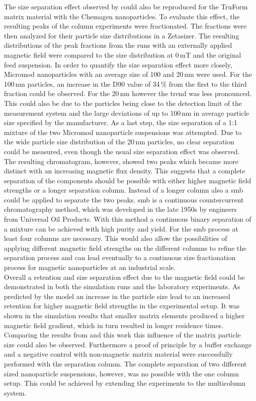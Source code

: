 The size separation effect observed by \cite{AndreMaster} could also be reproduced for the TruForm matrix material with the Chemagen nanoparticles. To evaluate this effect, the resulting peaks of the column experiments were fractionated. The fractions were then analyzed for their particle size distributions in a Zetasizer. The resulting distributions of the peak fractions from the runs with an externally applied magnetic field were compared to the size distribution at 0\,mT and the original feed suspension. In order to quantify the size separation effect more closely, Micromod nanoparticles with an average size of 100 and 20\,nm were used. For the 100\,nm particles, an increase in the D90 value of 34\,\% from the first to the third fraction could be observed. For the 20\,nm however the trend was less pronounced. This could also be due to the particles being close to the detection limit of the measurement system and the large deviations of up to 100\,nm in average particle size specified by the manufacturer. As a last step, the size separation of a 1:1 mixture of the two Micromod nanoparticle suspensions was attempted. Due to the wide particle size distribution of the 20\,nm particles, no clear separation could be measured, even though the usual size separation effect was observed. The resulting chromatogram, however, showed two peaks which became more distinct with an increasing magnetic flux density. This suggests that a complete separation of the components should be possible with either higher magnetic field strengths or a longer separation column. Instead of a longer column also a \gls{smb} could be applied to separate the two peaks. \Gls{smb} is a continuous countercurrent chromatography method, which was developed in the late 1950s by engineers from Universal Oil Products\cite{broughton1961continuous,carson1962rotary}. With this method a continuous binary separation of a mixture can be achieved with high purity and yield. For the \gls{smb} process at least four columns are necessary. This would also allow the possibilities of applying different magnetic field strengths on the different columns to refine the separation process and can lead eventually to a continuous size fractionation process for magnetic nanoparticles at an industrial scale.\\

Overall a retention and size separation effect due to the magnetic field could be demonstrated in both the simulation runs and the laboratory experiments. As predicted by the model an increase in the particle size lead to an increased retention for higher magnetic field strengths in the experimental setup. It was shown in the simulation results that smaller matrix elements produced a higher magnetic field gradient, which in turn resulted in longer residence times. Comparing the results from \cite{AndreMaster} and this work this influence of the matrix particle size could also be observed. Furthermore a proof of principle by a buffer exchange and a negative control with non-magnetic matrix material were successfully performed with the separation colunm. The complete separation of two different sized nanoparticle suspensions, however, was no possible with the one column setup. This could be achieved by extending the experiments to the multicolumn system.     